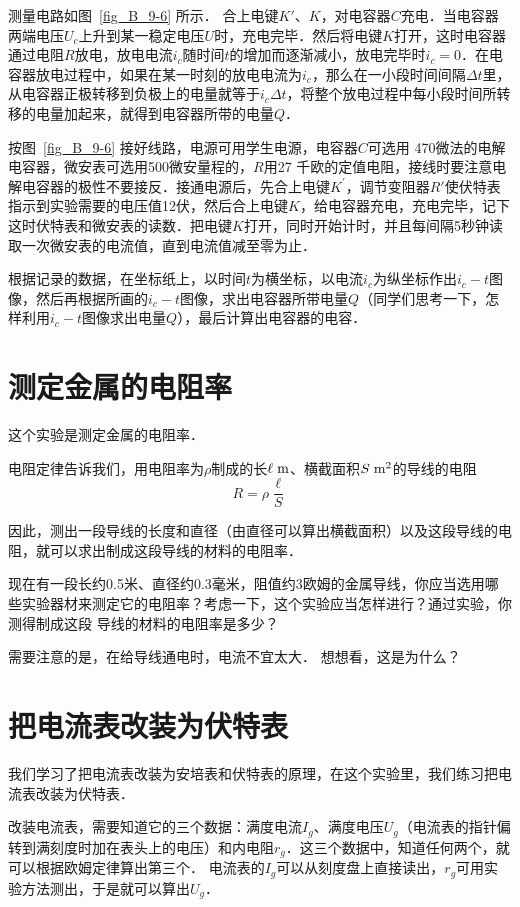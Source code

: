 测量电路如图~\ref{fig_B_9-6} 所示．
合上电键$K'$、$K$，对电容器$C$充电．当电容器两端电压$U_c$上升到某一稳定电压$U$时，充电完毕．然后将电键$K$打开，这时电容器通过电阻$R$放电，放电电流$i_c$随时间$t$的增加而逐渐减小，放电完毕时$i_c=0$．在电容器放电过程中，如果在某一时刻的放电电流为$i_c$，那么在一小段时间间隔$\Delta t$里，从电容器正极转移到负极上的电量就等于$i_c\Delta t$，将整个放电过程中每小段时间所转移的电量加起来，就得到电容器所带的电量$Q$．

按图~\ref{fig_B_9-6} 接好线路，电源可用学生电源，电容器$C$可选用
470微法的电解电容器，微安表可选用500微安量程的，$R$用27
千欧的定值电阻，接线时要注意电解电容器的极性不要接反．接通电源后，先合上电键$K^{\prime}$，调节变阻器$R'$使伏特表指示到实验需要的电压值12伏，然后合上电键$K$，给电容器充电，充电完毕，记下这时伏特表和微安表的读数．把电键$K$打开，同时开始计时，并且每间隔5秒钟读取一次微安表的电流值，直到电流值减至零为止．

根据记录的数据，在坐标纸上，以时间$t$为横坐标，以电流$i_c$为纵坐标作出$i_c-t$图像，然后再根据所画的$i_c-t$图像，求出电容器所带电量$Q$（同学们思考一下，怎样利用$i_c-t$图像求出电量$Q$），最后计算出电容器的电容．

\section{测定金属的电阻率}
这个实验是测定金属的电阻率．

电阻定律告诉我们，用电阻率为$\rho$制成的长$\ell \;\text{m} $、横截面积$S \;\text{m}^2 $的导线的电阻
\[R=\rho\frac{\ell}{S}\]

因此，测出一段导线的长度和直径（由直径可以算出横截面积）以及这段导线的电阻，就可以求出制成这段导线的材料的电阻率．

现在有一段长约0.5米、直径约0.3毫米，阻值约3欧姆的金属导线，你应当选用哪些实验器材来测定它的电阻率？考虑一下，这个实验应当怎样进行？通过实验，你测得制成这段
导线的材料的电阻率是多少？

需要注意的是，在给导线通电时，电流不宜太大．
想想看，这是为什么？

\section{把电流表改装为伏特表}
我们学习了把电流表改装为安培表和伏特表的原理，在这个实验里，我们练习把电流表改装为伏特表．

改装电流表，需要知道它的三个数据：满度电流$I_g$、满度电压$U_g$（电流表的指针偏转到满刻度时加在表头上的电压）和内电阻$r_g$．这三个数据中，知道任何两个，就可以根据欧姆定律算出第三个．
电流表的$I_g$可以从刻度盘上直接读出，$r_g$可用实验方法测出，于是就可以算出$U_g$．


